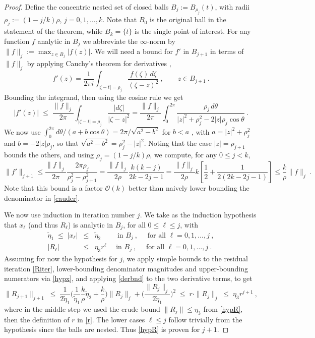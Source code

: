 \documentclass[10pt]{article}
\newcommand{\be}{\begin{equation}}
\newcommand{\ee}{\end{equation}}
\newcommand{\bea}{\begin{eqnarray}}
\newcommand{\eea}{\end{eqnarray}}
\newcommand{\bigO}{{\mathcal O}}
\newcommand{\te}{\tilde\eta}
\begin{document}
\begin{proof}
  Define the concentric nested set of closed balls $B_j := B_{\rho_j}(t)$,
  with radii $\rho_j := (1-j/k)\rho$, $j=0,1,\dots,k$. Note that
  $B_0$ is the original ball in the statement of the theorem, while
  $B_k = \{t\}$ is the single point of interest.
  For any function $f$ analytic in $B_j$ we abbreviate the $\infty$-norm by
  $\|f\|_j := \max_{z \in B_j}|f(z)|$.
  We will need a bound for $f'$ in $B_{j+1}$ in terms of $\|f\|_j$ by
  applying Cauchy's theorem for derivatives
  \cite{steinshakarchi},
  \be
  f'(z) = \frac{1}{2\pi i} \int_{|\zeta-t|=\rho_j} \frac{f(\zeta)\, d\zeta}{(\zeta-z)^2}
  ~, \qquad z \in B_{j+1}~.
  \label{cauder}
  \ee
  Bounding the integrand, then using the cosine rule we get
  $$
  |f'(z)| \;\le \;
  \frac{\|f\|_j}{2\pi} \int_{|\zeta-t| = \rho_j} \frac{|d\zeta|}{|\zeta-z|^2}
  =
  \frac{\|f\|_j}{2\pi} \int_0^{2\pi} \frac{\rho_j\, d\theta}{|z|^2 + \rho_j^2 - 2|z|\rho_j \cos \theta}~.
  $$
  We now use $\int_{0}^{2\pi} d\theta /(a + b \cos \theta) = 2\pi/\sqrt{a^2-b^2}$
  for $b<a$ \cite[Eq.~3.613.1]{GR8}, with
  $a = |z|^2 + \rho_j^2$ and $b = -2|z|\rho_j$, so that
  $\sqrt{a^2-b^2} = \rho_j^2-|z|^2$.
  Noting that the case $|z| = \rho_{j+1}$ bounds the others,
  and using $\rho_j=(1-j/k)\rho$, we compute, for any $0\le j < k$,
  \be
  \|f'\|_{j+1} \le
  \frac{\|f\|_j}{2\pi} \frac{2\pi\rho_j}{\rho_j^2-\rho_{j+1}^2}
  =
  \frac{\|f\|_j}{2 \rho} \frac{k(k-j)}{2k-2j-1}
  =
  \frac{\|f\|_j}{2 \rho} k \left[ \frac{1}{2} + \frac{1}{2(2k-2j-1)}\right]
  \le
  \frac{k}{\rho}\|f\|_j~.
  \label{derbnd}
  \ee
  Note that this bound is a factor $\bigO(k)$ better than naively
  lower bounding the denominator in \eqref{cauder}.
  
  We now use induction in iteration number $j$.
  We take as the induction hypothesis that $x_\ell$ (and thus $R_\ell$)
  is analytic in $B_j$, for all $0\le \ell \le j$, with
  \bea
  \te_1 \;\le\; |x_\ell| &\le& \te_2
  \qquad \mbox{ in } B_j~, \quad \mbox{ for all } \ell = 0,1,\dots,j~,
  \label{hypx}
  \\
  |R_\ell| &\le& \eta_3 r^\ell \quad \mbox{ in } B_j~, \quad \mbox{ for all } \ell = 0,1,\dots,j~.
  \label{hypR}
  \eea
  Assuming for now the hypothesis for $j$, we apply simple bounds to the
  residual iteration \eqref{Riter},
  lower-bounding denominator magnitudes and upper-bounding numerators
  via \eqref{hypx},
  and applying \eqref{derbnd} to the two derivative terms, to get
  $$
  \|R_{j+1}\|_{j+1}
  \;\le\;
  \frac{1}{2\te_1}\biggl(
  \frac{1}{\te_1} \frac{k}{\rho}\te_2 + \frac{k}{\rho}
  \biggr)\|R_j\|_j
  +\biggl(\frac{\|R_j\|_j}{2\te_1}\biggr)^2
  \;\le\;
  r \cdot \|R_j\|_j
  \;\le\;
  \eta_3 r^{j+1}~,
  $$
where in the middle step we used the crude bound $\|R_j\| \le \eta_3$
from \eqref{hypR}, then the definition of $r$ in \eqref{r}.
The lower cases $\ell\le j$ follow trivially from the hypothesis since the balls
are nested.
Thus \eqref{hypR} is proven for $j+1$.


\end{proof}
\end{document}
